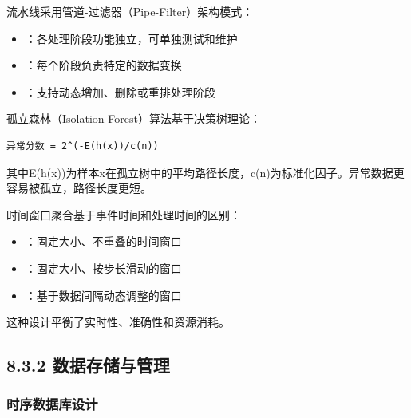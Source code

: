 
流水线采用管道-过滤器（Pipe-Filter）架构模式：

\begin{itemize}
\tightlist
\item
  ：各处理阶段功能独立，可单独测试和维护
\item
  ：每个阶段负责特定的数据变换
\item
  ：支持动态增加、删除或重排处理阶段
\end{itemize}


孤立森林（Isolation Forest）算法基于决策树理论：

\begin{lstlisting}
异常分数 = 2^(-E(h(x))/c(n))
\end{lstlisting}

其中E(h(x))为样本x在孤立树中的平均路径长度，c(n)为标准化因子。异常数据更容易被孤立，路径长度更短。


时间窗口聚合基于事件时间和处理时间的区别：

\begin{itemize}
\tightlist
\item
  ：固定大小、不重叠的时间窗口
\item
  ：固定大小、按步长滑动的窗口\\
\item
  ：基于数据间隔动态调整的窗口
\end{itemize}

这种设计平衡了实时性、准确性和资源消耗。

\hypertarget{ux6570ux636eux5b58ux50a8ux4e0eux7ba1ux7406}{%
\subsection{8.3.2 数据存储与管理}\label{ux6570ux636eux5b58ux50a8ux4e0eux7ba1ux7406}}

\hypertarget{ux65f6ux5e8fux6570ux636eux5e93ux8bbeux8ba1}{%
\subsubsection{时序数据库设计}\label{ux65f6ux5e8fux6570ux636eux5e93ux8bbeux8ba1}}

